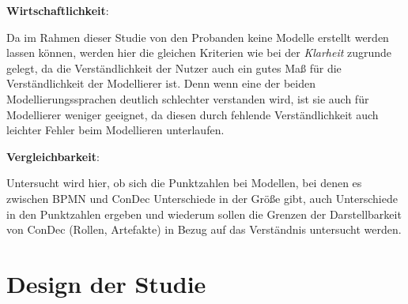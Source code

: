 \textbf{Wirtschaftlichkeit}: 

Da im Rahmen dieser Studie von den Probanden keine Modelle erstellt werden lassen können, werden hier die gleichen Kriterien wie bei der \textit{Klarheit} zugrunde gelegt, da die Verständlichkeit der Nutzer auch ein gutes Maß für die Verständlichkeit der Modellierer ist. Denn wenn eine der beiden Modellierungssprachen deutlich schlechter verstanden wird, ist sie auch für Modellierer weniger geeignet, da diesen durch fehlende Verständlichkeit auch leichter Fehler beim Modellieren unterlaufen.\newline

\textbf{Vergleichbarkeit}: 

Untersucht wird hier, ob sich die Punktzahlen bei Modellen, bei denen es zwischen BPMN und ConDec Unterschiede in der Größe gibt, auch Unterschiede in den Punktzahlen ergeben und wiederum sollen die Grenzen der Darstellbarkeit von ConDec (Rollen, Artefakte) in Bezug auf das Verständnis untersucht werden.\newline


\section{Design der Studie}

